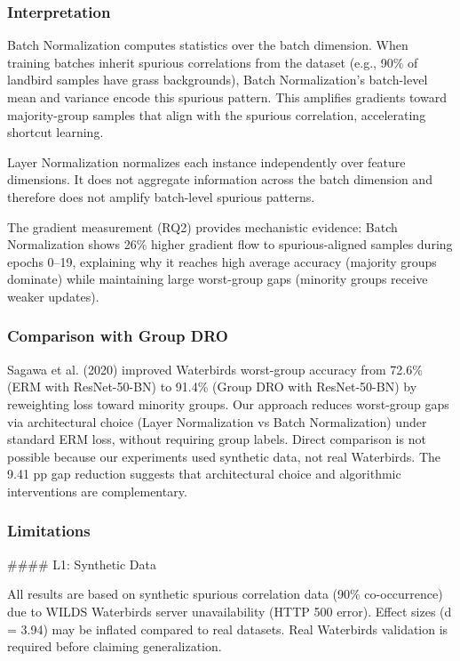 
\subsubsection{Interpretation}

Batch Normalization computes statistics over the batch dimension. When training batches inherit spurious correlations from the dataset (e.g., 90\% of landbird samples have grass backgrounds), Batch Normalization's batch-level mean and variance encode this spurious pattern. This amplifies gradients toward majority-group samples that align with the spurious correlation, accelerating shortcut learning.

Layer Normalization normalizes each instance independently over feature dimensions. It does not aggregate information across the batch dimension and therefore does not amplify batch-level spurious patterns.

The gradient measurement (RQ2) provides mechanistic evidence: Batch Normalization shows 26\% higher gradient flow to spurious-aligned samples during epochs 0--19, explaining why it reaches high average accuracy (majority groups dominate) while maintaining large worst-group gaps (minority groups receive weaker updates).

\subsubsection{Comparison with Group DRO}

Sagawa et al. (2020) improved Waterbirds worst-group accuracy from 72.6\% (ERM with ResNet-50-BN) to 91.4\% (Group DRO with ResNet-50-BN) by reweighting loss toward minority groups. Our approach reduces worst-group gaps via architectural choice (Layer Normalization vs Batch Normalization) under standard ERM loss, without requiring group labels. Direct comparison is not possible because our experiments used synthetic data, not real Waterbirds. The 9.41 pp gap reduction suggests that architectural choice and algorithmic interventions are complementary.

\subsubsection{Limitations}

\#\#\#\# L1: Synthetic Data

All results are based on synthetic spurious correlation data (90\% co-occurrence) due to WILDS Waterbirds server unavailability (HTTP 500 error). Effect sizes (d = 3.94) may be inflated compared to real datasets. Real Waterbirds validation is required before claiming generalization.

